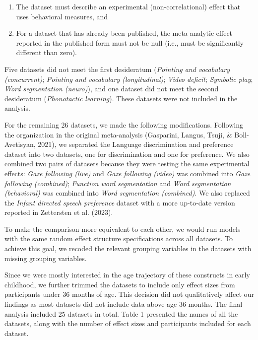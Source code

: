 \documentclass[
  man]{apa6}
\providecommand{\tightlist}{%
  \setlength{\itemsep}{0pt}\setlength{\parskip}{0pt}}
\begin{document}
\begin{enumerate}
\def\labelenumi{\arabic{enumi}.}
\tightlist
\item
  The dataset must describe an experimental (non-correlational) effect that uses behavioral measures, and
\item
  For a dataset that has already been published, the meta-analytic effect reported in the published form must not be null (i.e., must be significantly different than zero).
\end{enumerate}

Five datasets did not meet the first desideratum (\emph{Pointing and vocabulary (concurrent)}; \emph{Pointing and vocabulary (longitudinal)}; \emph{Video deficit}; \emph{Symbolic play}; \emph{Word segmentation (neuro)}), and one dataset did not meet the second desideratum (\emph{Phonotactic learning}). These datasets were not included in the analysis.

For the remaining 26 datasets, we made the following modifications. Following the organization in the original meta-analysis (Gasparini, Langus, Tsuji, \& Boll-Avetisyan, 2021), we separated the Language discrimination and preference dataset into two datasets, one for discrimination and one for preference. We also combined two pairs of datasets because they were testing the same experimental effects: \emph{Gaze following (live)} and \emph{Gaze following (video)} was combined into \emph{Gaze following (combined)}; \emph{Function word segmentation} and \emph{Word segmentation (behavioral)} was combined into \emph{Word segmentation (combined)}. We also replaced the \emph{Infant directed speech preference} dataset with a more up-to-date version reported in Zettersten et al. (2023).

To make the comparison more equivalent to each other, we would run models with the same random effect structure specifications across all datasets. To achieve this goal, we recoded the relevant grouping variables in the datasets with missing grouping variables.

Since we were mostly interested in the age trajectory of these constructs in early childhood, we further trimmed the datasets to include only effect sizes from participants under 36 months of age. This decision did not qualitatively affect our findings as most datasets did not include data above age 36 months. The final analysis included 25 datasets in total. Table 1 presented the names of all the datasets, along with the number of effect sizes and participants included for each dataset.
\end{document}
